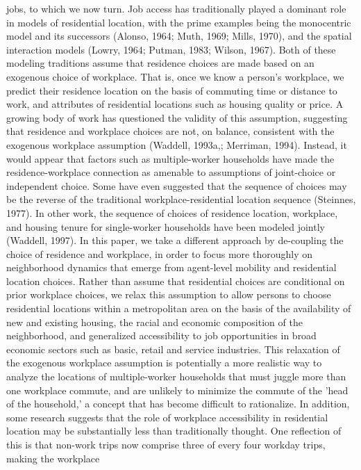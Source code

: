 \documentclass[12pt,a4paper]{article}
\begin{document}
jobs, to which we now turn. Job access has traditionally played a
dominant role in models of residential location, with the prime
examples being the monocentric model and its successors (Alonso,
1964; Muth, 1969; Mills, 1970), and the spatial interaction models
(Lowry, 1964; Putman, 1983; Wilson, 1967).  Both of these modeling
traditions assume that residence choices are made based on an
exogenous choice of workplace.  That is, once we know a person's
workplace, we predict their residence location on the basis of
commuting time or distance to work, and attributes of residential
locations such as housing quality or price.  A growing body of
work has questioned the validity of this assumption, suggesting
that residence and workplace choices are not, on balance,
consistent with the exogenous workplace assumption (Waddell,
1993a,; Merriman, 1994).  Instead, it would appear that factors
such as multiple-worker households have made the
residence-workplace connection as amenable to assumptions of
joint-choice or independent choice.  Some have even suggested that
the sequence of choices may be the reverse of the traditional
workplace-residential location sequence (Steinnes, 1977). In other
work, the sequence of choices of residence location, workplace,
and housing tenure for single-worker households have been modeled
jointly (Waddell, 1997).  In this paper, we take a different
approach by de-coupling the choice of residence and workplace, in
order to focus more thoroughly on neighborhood dynamics that
emerge from agent-level mobility and residential location choices.
Rather than assume that residential choices are conditional on
prior workplace choices, we relax this assumption to allow persons
to choose residential locations within a metropolitan area on the
basis of the availability of new and existing housing, the racial
and economic composition of the neighborhood, and generalized
accessibility to job opportunities in broad economic sectors such
as basic, retail and service industries. This relaxation of the
exogenous workplace assumption is potentially a more realistic way
to analyze the locations of multiple-worker households that must
juggle more than one workplace commute, and are unlikely to
minimize the commute of the 'head of the household,' a concept
that has become difficult to rationalize.  In addition, some
research suggests that the role of workplace accessibility in
residential location may be substantially less than traditionally
thought.  One reflection of this is that non-work trips now
comprise three of every four workday trips, making the workplace
\end{document}
